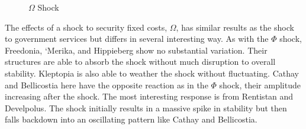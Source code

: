 \documentclass[12pt]{article}
\begin{document}
\begin{spacing}{1.5}
 
\begin{figure}
\centering
{} 
\caption{$\Omega$ Shock}

\end{figure}

The effects of a shock to security fixed costs, $\Omega$, has similar results as the shock to government services but differs in several interesting way. As with the $\Phi$ shock, Freedonia, `Merika, and Hippieberg show no substantial variation. Their structures are able to absorb the shock without much disruption to overall stability. Kleptopia is also able to weather the shock without fluctuating. Cathay and Bellicostia here have the opposite reaction as in the $\Phi$ shock, their amplitude increasing after the shock. The most interesting response is from Rentistan and Develpolus. The shock initially results in a massive spike in stability but then falls backdown into an oscillating pattern like Cathay and Bellicostia. %


\end{spacing}
\end{document}
